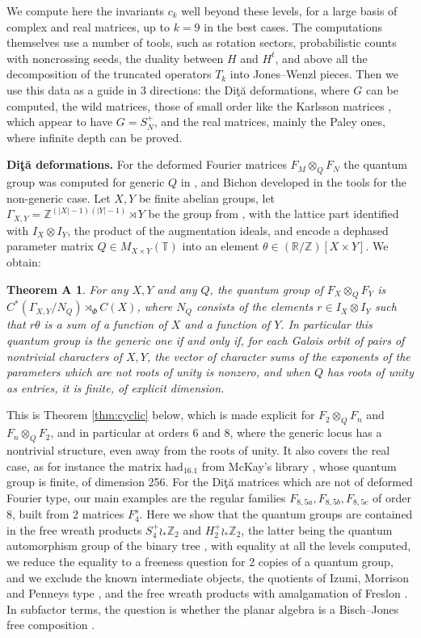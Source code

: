 \documentclass[11pt]{amsart}
\newtheorem*{thmA}{Theorem A}
\newcommand{\T}{\mathbb T}
\begin{document}
We compute here the invariants $c_k$ well beyond these levels, for a large basis of complex and real matrices, up to $k=9$ in the best cases. The computations themselves use a number of tools, such as rotation sectors, probabilistic counts with noncrossing seeds, the duality between $H$ and $H^t$, and above all the decomposition of the truncated operators $T_k$ into Jones--Wenzl pieces. Then we use this data as a guide in 3 directions: the Di\c t\u a deformations, where $G$ can be computed, the wild matrices, those of small order like the Karlsson matrices \cite{kar}, which appear to have $G=S_N^+$, and the real matrices, mainly the Paley ones, where infinite depth can be proved.

\medskip

\noindent\textbf{Di\c t\u a deformations.} For the deformed Fourier matrices $F_M\otimes_QF_N$ the quantum group was computed for generic $Q$ in \cite{bb3}, and Bichon developed in \cite{bic} the tools for the non-generic case. Let $X,Y$ be finite abelian groups, let $\Gamma_{X,Y}=\mathbb Z^{(|X|-1)(|Y|-1)}\rtimes Y$ be the group from \cite{bb3}, with the lattice part identified with $I_X\otimes I_Y$, the product of the augmentation ideals, and encode a dephased parameter matrix $Q\in M_{X\times Y}(\T)$ into an element $\theta\in(\mathbb R/\mathbb Z)[X\times Y]$. We obtain:

\begin{thmA}
For any $X,Y$ and any $Q$, the quantum group of $F_X\otimes_QF_Y$ is $C^*(\Gamma_{X,Y}/N_Q)\rtimes_\Phi C(X)$, where $N_Q$ consists of the elements $r\in I_X\otimes I_Y$ such that $r\theta$ is a sum of a function of $X$ and a function of $Y$. In particular this quantum group is the generic one if and only if, for each Galois orbit of pairs of nontrivial characters of $X,Y$, the vector of character sums of the exponents of the parameters which are not roots of unity is nonzero, and when $Q$ has roots of unity as entries, it is finite, of explicit dimension.
\end{thmA}

This is Theorem \ref{thm:cyclic} below, which is made explicit for $F_2\otimes_QF_n$ and $F_n\otimes_QF_2$, and in particular at orders 6 and 8, where the generic locus has a nontrivial structure, even away from the roots of unity. It also covers the real case, as for instance the matrix $\mathrm{had}_{16.1}$ from McKay's library \cite{mck}, whose quantum group is finite, of dimension 256. For the Di\c t\u a matrices which are not of deformed Fourier type, our main examples are the regular families $F_{8,5a},F_{8,5b},F_{8,5c}$ of order 8, built from 2 matrices $F_4^s$. Here we show that the quantum groups are contained in the free wreath products $S_4^+\wr_*\mathbb Z_2$ and $H_2^+\wr_*\mathbb Z_2$, the latter being the quantum automorphism group of the binary tree \cite{dkr,dfk}, with equality at all the levels computed, we reduce the equality to a freeness question for 2 copies of a quantum group, and we exclude the known intermediate objects, the quotients of Izumi, Morrison and Penneys type \cite{imp}, and the free wreath products with amalgamation of Freslon \cite{fre}. In subfactor terms, the question is whether the planar algebra is a Bisch--Jones free composition \cite{bjo,twa}.
\end{document}
